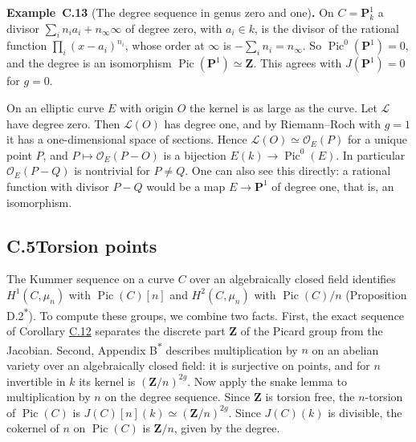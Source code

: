 \documentclass[11pt]{article}
\newenvironment{bpstatement}[2]{\par\addvspace{0.6\baselineskip}\noindent\textbf{#1}#2\textbf{.}\enspace\ignorespaces}
  {\par\addvspace{0.4\baselineskip}}
\newcommand{\bpout}[1]{#1\textsuperscript{\hyperlink{bp-outside}{\ensuremath{\ast}}}}
\begin{document}
\label{bp41}%
\begin{bpstatement}{Example~C.13}{ (The degree sequence in genus zero and one)}
On \(C=\mathbf P^1_k\) a divisor \(\sum_in_ia_i+n_\infty\infty\) of degree zero, with \(a_i\in k\), is the divisor of the rational function \(\prod_i(x-a_i)^{n_i}\), whose order at \(\infty\) is \(-\sum_in_i=n_\infty\). So \(\operatorname{Pic}^0(\mathbf P^1)=0\), and the degree is an isomorphism \(\operatorname{Pic}(\mathbf P^1)\simeq\mathbf Z\). This agrees with \(J(\mathbf P^1)=0\) for \(g=0\).

On an elliptic curve \(E\) with origin \(O\) the kernel is as large as the curve. Let \(\mathcal L\) have degree zero. Then \(\mathcal L(O)\) has degree one, and by Riemann–Roch with \(g=1\) it has a one-dimensional space of sections. Hence \(\mathcal L(O)\simeq\mathcal O_E(P)\) for a unique point \(P\), and \(P\mapsto\mathcal O_E(P-O)\) is a bijection \(E(k)\to\operatorname{Pic}^0(E)\). In particular \(\mathcal O_E(P-Q)\) is nontrivial for \(P\neq Q\). One can also see this directly: a rational function with divisor \(P-Q\) would be a map \(E\to\mathbf P^1\) of degree one, that is, an isomorphism.
\end{bpstatement}


\subsection*{\texorpdfstring{C.5\quad Torsion points}{C.5 Torsion points}}
\label{bp42}%
\label{bp43}%
The Kummer sequence on a curve \(C\) over an algebraically closed field identifies \(H^1(C,\mu_n)\) with \(\operatorname{Pic}(C)[n]\) and \(H^2(C,\mu_n)\) with \(\operatorname{Pic}(C)/n\) (Proposition \bpout{D.2}). To compute these groups, we combine two facts. First, the exact sequence of Corollary \hyperref[bp39]{C.12} separates the discrete part \(\mathbf Z\) of the Picard group from the Jacobian. Second, Appendix \bpout{B} describes multiplication by \(n\) on an abelian variety over an algebraically closed field: it is surjective on points, and for \(n\) invertible in \(k\) its kernel is \((\mathbf Z/n)^{2g}\). Now apply the snake lemma to multiplication by \(n\) on the degree sequence. Since \(\mathbf Z\) is torsion free, the \(n\)-torsion of \(\operatorname{Pic}(C)\) is \(J(C)[n](k)\simeq(\mathbf Z/n)^{2g}\). Since \(J(C)(k)\) is divisible, the cokernel of \(n\) on \(\operatorname{Pic}(C)\) is \(\mathbf Z/n\), given by the degree.
\end{document}
